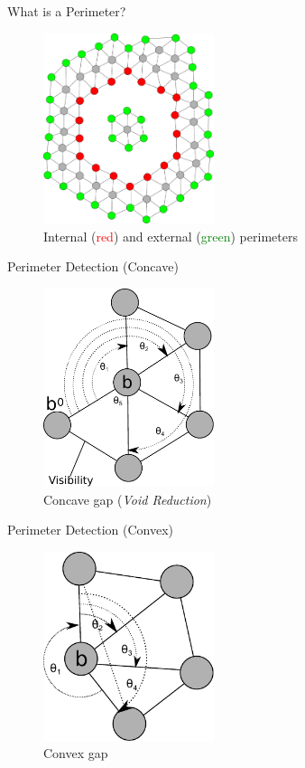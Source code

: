 \documentclass{beamer}
\begin{document}
\begin{frame}{What is a Perimeter?}
  \begin{figure}
    \begin{center}
      \includegraphics[width=5cm]{Perimeters.pdf}
    \end{center}
    \caption{Internal (\textcolor{red}{red}) and external (\textcolor{green}{green}) perimeters}
  \end{figure}
\end{frame}

\begin{frame}{Perimeter Detection (Concave)}
  \begin{figure}
    \begin{center}
      \includegraphics[width=5cm]{Perimeter1.pdf}
    \end{center}
    \caption{Concave gap (\textit{Void Reduction})}
  \end{figure}
\end{frame}

\begin{frame}{Perimeter Detection (Convex)}
  \begin{figure}
    \begin{center}
      \includegraphics[width=5cm]{Perimeter2.pdf}
    \end{center}
    \caption{Convex gap}
  \end{figure}
\end{frame}
\end{document}

